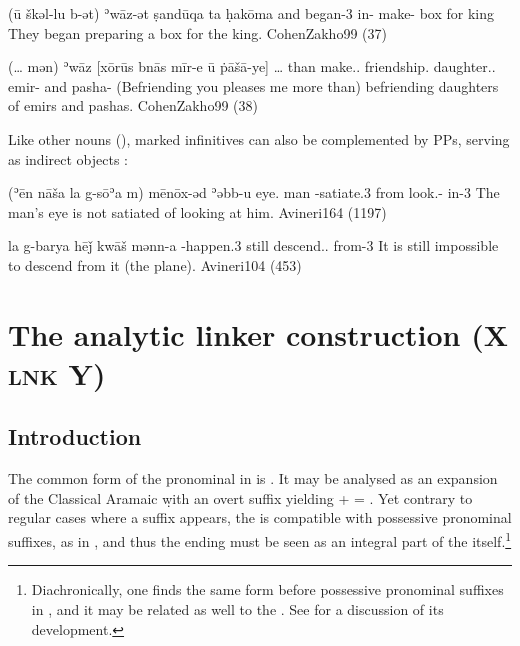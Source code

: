 {(ū\cb{} škəl-lu b-ət) ʾwāz-ət ṣandūqa ta ḥakōma}
{and\cb{} began-3\pl{} in-\cst{} make-\cst{} box for king}
{They began preparing a box for the king.}
{CohenZakho}{99 (37)}\antipar

{(\ldots{} mən) ʾwāz [xōrūs bnās mīr-e ū\cb{} ṗāšā-ye]}
{\ldots{} than make.\inf.\cst{} friendship.\cst{} daughter.\pl.\cst{} emir-\pl{} and\cb{} pasha-\pl}
{(Befriending you pleases me more than) befriending daughters of emirs and pashas.}
{CohenZakho}{99 (38)}\antipar

 
Like other nouns (), \cst* marked infinitives can also be complemented by PPs, serving as indirect objects  \citep[117]{CohenZakho}:

{(ʾēn nāša la\cb{} g-sōʾa m\cb{}) mēnōx-əd ʾəbb-u}
{eye.\cst{} man \neg\cb{} \ind-satiate.3\fem{} from\cb{} look.\inf-\cst{} in-3\masc}
{The man’s eye is not satiated of looking at him.}
{Avineri}{164 (1197)}\antipar

 

{la\cb{} g-barya hēǰ kwāš mənn-a}
{\neg{} \ind-happen.3\fem{} still descend.\inf.\cst{} from-3\fem}
{It is still impossible to descend from it (the plane).}
{Avineri}{104 (453)}\antipar\antipar
 
\section{The analytic linker construction (X \textsc{lnk} Y)} \label{ss:JZax_Lnk}
\subsection{Introduction}
The common form of the pronominal \lnk* in \JZax is . It may be analysed as an expansion of the Classical Aramaic \lnk* \d with an overt \cst* suffix yielding  + \ed = . Yet   contrary to regular cases where a \cst* suffix appears, the \lnk* {} is compatible with possessive pronominal suffixes, as in , and thus the ending  must be seen as an integral part of the \lnk* itself.\footnote{Diachronically, one finds the same form before possessive pronominal suffixes in \JBA, and it may be related as well to the \Syr {}. See  for a discussion of its development.}

